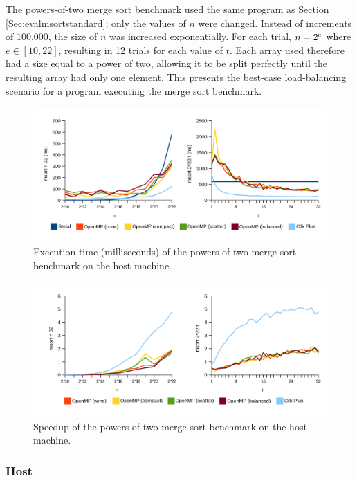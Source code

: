\documentclass{report}
\begin{document}
The powers-of-two merge sort benchmark used the same program as Section \ref{Sec:evalmsortstandard}; only the values of \(n\) were changed. Instead of increments of 100,000, the size of \(n\) was increased exponentially. For each trial, \(n=2\textsuperscript{e}\) where \(e \in [10,22]\), resulting in 12 trials for each value of \(t\). Each array used therefore had a size equal to a power of two, allowing it to be split perfectly until the resulting array had only one element. This presents the best-case load-balancing scenario for a program executing the merge sort benchmark.
\noindent
\begin{figure}[t!]
	\includegraphics[width=\linewidth]{../../charts/intel64/msort_powers_time}
	\caption{Execution time (milliseconds) of the powers-of-two merge sort benchmark on the host machine.}
	\label{Fig:msortpowershosttime}
\end{figure}
\noindent
\begin{figure}[t!]
	\includegraphics[width=\linewidth]{../../charts/intel64/msort_powers_speedup}
	\caption{Speedup of the powers-of-two merge sort benchmark on the host machine.}
	\label{Fig:msortpowershostspeedup}
\end{figure}

\subsubsection{Host}
\end{document}
